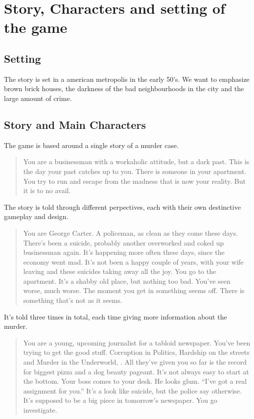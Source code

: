 \documentclass{article}
\begin{document}
\section{Story, Characters and setting of the game}
	\subsection{Setting}
		The story is set in a american metropolis in the early 50's. We want to emphasize brown brick houses, the darkness of the bad neighbourhoods in the city and the large amount of crime. 
	\subsection{Story and Main Characters}
		The game is based around a single story of a murder case. 
		\begin{quote}
			You are a businessman with a workaholic attitude, but a dark past. This is the day your past catches up to you. There is someone in your apartment. You try to run and escape from the madness that is now your reality. But it is to no avail.
		\end{quote}
		The story is told through different perpectives, each with their own destinctive gameplay and design. 
		\begin{quote}
			You are George Carter. A policeman, as clean as they come these days. There’s been a suicide, probably another overworked and coked up businessman again. It’s happening more often these days, since the economy went mad. It’s not been a happy couple of years, with your wife leaving and these suicides taking away all the joy. You go to the apartment. It’s a shabby old place, but nothing too bad. You’ve seen worse, much worse. The moment you get in something seems off. There is something that’s not as it seems.
		\end{quote}
		It's told three times in total, each time giving more information about the murder. 
		\begin{quote}
			You are a young, upcoming journalist for a tabloid newspaper. You’ve been trying to get the good stuff. Corruption in Politics, Hardship on the streets and Murder in the Underworld, . All they’ve given you so far is the record for biggest pizza and a dog beauty pageant. It’s not always easy to start at the bottom. Your boss comes to your desk. He looks glum. “I’ve got a real assignment for you.” It’s a look like suicide, but the police say otherwise. It’s supposed to be a big piece in tomorrow’s newspaper. You go investigate.
		\end{quote}
\end{document}
